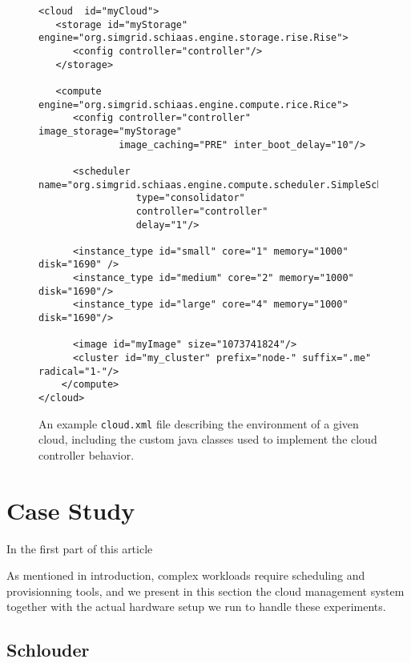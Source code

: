 \begin{figure}[hbt] 
 \lstset{language=xml,label= ,caption= ,numbers=left}
\begin{lstlisting}
<cloud  id="myCloud">
   <storage id="myStorage" engine="org.simgrid.schiaas.engine.storage.rise.Rise">
      <config controller="controller"/>
   </storage>

   <compute engine="org.simgrid.schiaas.engine.compute.rice.Rice"> 		
      <config controller="controller" image_storage="myStorage"
              image_caching="PRE" inter_boot_delay="10"/>
  
      <scheduler name="org.simgrid.schiaas.engine.compute.scheduler.SimpleScheduler"
                 type="consolidator"
                 controller="controller"
                 delay="1"/>
  
      <instance_type id="small" core="1" memory="1000" disk="1690" />				
      <instance_type id="medium" core="2" memory="1000" disk="1690"/>
      <instance_type id="large" core="4" memory="1000" disk="1690"/>
  
      <image id="myImage" size="1073741824"/>
      <cluster id="my_cluster" prefix="node-" suffix=".me" radical="1-"/>  
    </compute>
</cloud>
\end{lstlisting}
\caption{An example \texttt{cloud.xml} file describing the environment of a
  given cloud, including the custom java classes used to implement the
  cloud controller behavior.}
\label{fg:cloud.xml}
\end{figure}


\section{Case Study}
\label{sc:context}

In the first part of this article

As  mentioned   in  introduction,  complex  workloads   require  scheduling  and
provisionning tools, and we present in  this section the cloud management system
together with the actual hardware setup we run to handle these experiments.

\subsection{Schlouder}

